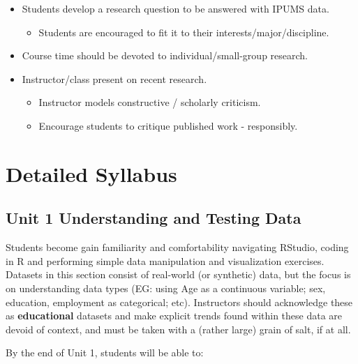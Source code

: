 \documentclass[
]{book}
\providecommand{\tightlist}{%
  \setlength{\itemsep}{0pt}\setlength{\parskip}{0pt}}
\begin{document}
\begin{itemize}
\tightlist
\item
  Students develop a research question to be answered with IPUMS data.

  \begin{itemize}
  \tightlist
  \item
    Students are encouraged to fit it to their interests/major/discipline.
  \end{itemize}
\item
  Course time should be devoted to individual/small-group research.
\item
  Instructor/class present on recent research.

  \begin{itemize}
  \tightlist
  \item
    Instructor models constructive / scholarly criticism.
  \item
    Encourage students to critique published work - responsibly.
  \end{itemize}
\end{itemize}

\hypertarget{detailed-syllabus}{%
\section*{Detailed Syllabus}\label{detailed-syllabus}}

\newpage

\hypertarget{unit-1-understanding-and-testing-data}{%
\subsection*{Unit 1 Understanding and Testing Data}\label{unit-1-understanding-and-testing-data}}

Students become gain familiarity and comfortability navigating RStudio, coding in R and performing simple data manipulation and visualization exercises. Datasets in this section consist of real-world (or synthetic) data, but the focus is on understanding data types (EG: using Age as a continuous variable; sex, education, employment as categorical; etc). Instructors should acknowledge these as \textbf{educational} datasets and make explicit trends found within these data are devoid of context, and must be taken with a (rather large) grain of salt, if at all.

By the end of Unit 1, students will be able to:
\end{document}
